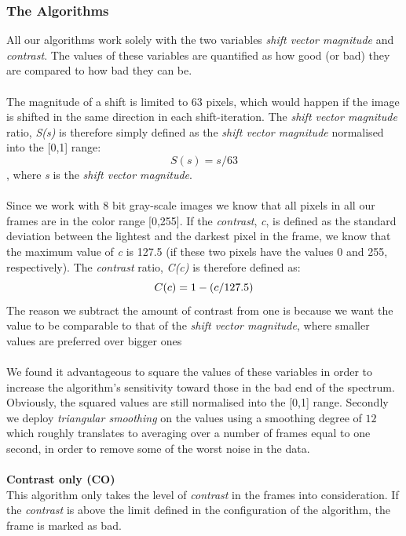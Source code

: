 \documentclass[12pt]{article}
\begin{document}
\subsubsection{The Algorithms}
%
All our algorithms work solely with the two variables \textit{shift vector magnitude} and \textit{contrast}. The values of these variables are quantified as how good (or bad) they are compared to how bad they can be.\\
\\
The magnitude of a shift is limited to 63 pixels, which would happen if the image is shifted in the same direction in each shift-iteration. The \textit{shift vector magnitude} ratio, \textit{S(s)} is therefore simply defined as the \textit{shift vector magnitude} normalised into the [0,1] range:
\[
S(s) = s / 63 
\]
, where \textit{s} is the \textit{shift vector magnitude}.\\
\\
Since we work with 8 bit gray-scale images we know that all pixels in all our frames are in the color range [0,255]. If the \textit{contrast}, \textit{c}, is defined as the standard deviation between the lightest and the darkest pixel in the frame, we know that the maximum value of \textit{c} is 127.5 (if these two pixels have the values 0 and 255, respectively). The \textit{contrast} ratio, \textit{C(c)} is therefore defined as:
\[
C(c) = 1 - (c / 127.5)\\
\]
The reason we subtract the amount of contrast from one is because we want the value to be comparable to that of the \textit{shift vector magnitude}, where smaller values are preferred over bigger ones\\
\\
We found it advantageous to square the values of these variables in order to increase the algorithm’s sensitivity toward those in the bad end of the spectrum. Obviously, the squared values are still normalised into the [0,1] range. Secondly we deploy \textit{triangular smoothing} on the values using a smoothing degree of $12$ which roughly translates to averaging over a number of frames equal to one second, in order to remove some of the worst noise in the data.\\\\
%
\textbf{Contrast only (CO)}\\
This algorithm only takes the level of \textit{contrast} in the frames into consideration. If the \textit{contrast} is above the limit defined in the configuration of the algorithm, the frame is marked as bad.\\\\
\end{document}
